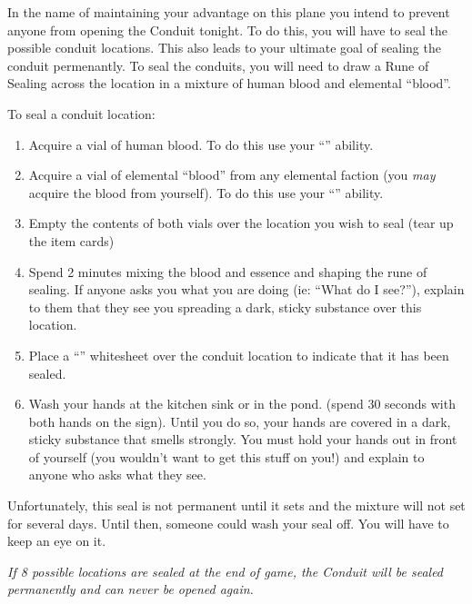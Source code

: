 \documentclass[green]{elementals}
\begin{document}
\name{\gSealingLocations{}}

In the name of maintaining your advantage on this plane you intend to prevent anyone from opening the Conduit tonight.  To do this, you will have to seal the possible conduit locations. This also leads to your ultimate goal of sealing the conduit permenantly. To seal the conduits, you will need to draw a Rune of Sealing across the location in a mixture of human blood and elemental ``blood''.

To seal a conduit location:
\begin{enumerate}
  \item Acquire a vial of human blood. To do this use your ``\aDrawBlood{}'' ability.
  \item Acquire a vial of elemental ``blood'' from any elemental faction (you \emph{may} acquire the blood from yourself). To do this use your ``\aDrawBlood{}'' ability.
  \item Empty the contents of both vials over the location you wish to seal (tear up the item cards)
  \item Spend 2 minutes mixing the blood and essence and shaping the rune of sealing. If anyone asks you what you are doing (ie: ``What do I see?''), explain to them that they see you spreading a dark, sticky substance over this location.
  \item Place a ``\wSealedConduit{}'' whitesheet over the conduit location to indicate that it has been sealed.
  \item Wash your hands at the kitchen sink or in the pond. (spend 30 seconds with both hands on the sign). Until you do so, your hands are covered in a dark, sticky substance that smells strongly. You must hold your hands out in front of yourself (you wouldn't want to get this stuff on you!) and explain to anyone who asks what they see.
\end{enumerate}

Unfortunately, this seal is not permanent until it sets and the mixture will not set for several days. Until then, someone could wash your seal off. You will have to keep an eye on it.

{\large \emph{If 8 possible locations are sealed at the end of game, the Conduit will be sealed permanently and can never be opened again.}}
\end{document}
